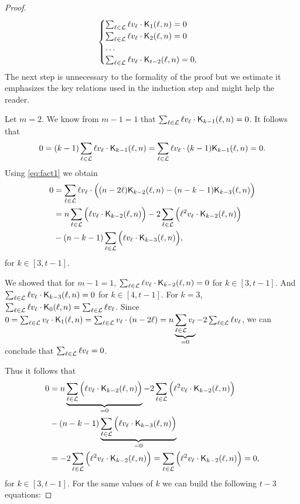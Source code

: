 \begin{proof}
    \begin{equation*}
        \begin{cases}
            \sum_{\ell \in \mathcal{L}} \ell v_\ell \cdot \mathsf{K}_{1}(\ell,n) = 0\\
            \sum_{\ell \in \mathcal{L}} \ell v_\ell \cdot \mathsf{K}_{2}(\ell,n) = 0\\
            \ldots\\
            \sum_{\ell \in \mathcal{L}} \ell v_\ell \cdot \mathsf{K}_{t-2}(\ell,n) = 0.\\
        \end{cases}
    \end{equation*}
    The next step is unnecessary to the formality of the proof but we estimate it emphasizes the key relations used in the induction step and might help the reader.

    Let $m = 2$. We know from $m - 1 = 1$ that $\sum_{\ell \in \mathcal{L}} \ell v_\ell \cdot \mathsf{K}_{k-1}(\ell,n) = 0$. It follows that
    $$
    0 = (k-1)\sum_{\ell \in \mathcal{L}} \ell v_\ell \cdot \mathsf{K}_{k-1}(\ell,n) = \sum_{\ell \in \mathcal{L}} \ell v_\ell \cdot (k-1)\mathsf{K}_{k-1}(\ell,n) = 0.
    $$
    Using \cref{eq:fact1} we obtain
    \begin{equation*}
    \begin{split}
        0 &= \sum_{\ell \in \mathcal{L}} \ell v_\ell \cdot \Big( (n - 2\ell)\mathsf{K}_{k-2}(\ell,n) - (n - k - 1)\mathsf{K}_{k-3}(\ell,n) \Big)\\
        & = n \sum_{\ell \in \mathcal{L}} \Big( \ell v_\ell \cdot \mathsf{K}_{k-2}(\ell,n) \Big) - 2\sum_{\ell \in \mathcal{L}} \Big( \ell^2v_\ell \cdot \mathsf{K}_{k-2}(\ell,n) \Big)\\& - (n - k - 1)\sum_{\ell \in \mathcal{L}} \Big( \ell v_\ell \cdot \mathsf{K}_{k-3}(\ell,n) \Big),
    \end{split}
    \end{equation*}
    for $k \in [3, t - 1]$.

    We showed that for $m - 1 = 1$, $\sum_{\ell \in \mathcal{L}} \ell v_\ell \cdot \mathsf{K}_{k-2}(\ell,n) = 0$ for $k \in [3, t-1]$.
    And $\sum_{\ell \in \mathcal{L}} \ell v_\ell \cdot \mathsf{K}_{k-3}(\ell,n) = 0$ for $k \in [4, t-1]$.
    For $k = 3$, $\sum_{\ell \in \mathcal{L}} \ell v_\ell \cdot \mathsf{K}_{0}(\ell,n) = \sum_{\ell \in \mathcal{L}} \ell v_\ell$.
    Since $0 = \sum_{\ell \in \mathcal{L}} v_\ell \cdot \mathsf{K}_{1}(\ell,n) = \sum_{\ell \in \mathcal{L}} v_\ell \cdot(n - 2\ell) = n\underbrace{\sum_{\ell \in \mathcal{L}} v_\ell}_{=0} -2\sum_{\ell \in \mathcal{L}} \ell v_\ell$, we can conclude that $\sum_{\ell \in \mathcal{L}}\ell v_\ell = 0$.

    Thus it follows that
    \begin{equation*}
        \begin{split}
            0 &= n \underbrace{\sum_{\ell \in \mathcal{L}} \Big( \ell v_\ell \cdot \mathsf{K}_{k-2}(\ell,n) \Big)}_{=0} - 2\sum_{\ell \in \mathcal{L}} \Big( \ell^2v_\ell \cdot \mathsf{K}_{k-2}(\ell,n) \Big)\\& - (n - k - 1)\underbrace{\sum_{\ell \in \mathcal{L}} \Big( \ell v_\ell \cdot \mathsf{K}_{k-3}(\ell,n) \Big)}_{=0}\\
            &= -2\sum_{\ell \in \mathcal{L}} \Big( \ell^2v_\ell \cdot \mathsf{K}_{k-2}(\ell,n) \Big) = \sum_{\ell \in \mathcal{L}} \Big( \ell^2v_\ell \cdot \mathsf{K}_{k-2}(\ell,n) \Big) = 0,
        \end{split}
    \end{equation*}
    for $k \in [3, t-1]$. For the same values of $k$ we can build the following $t-3$ equations:


\end{proof}

